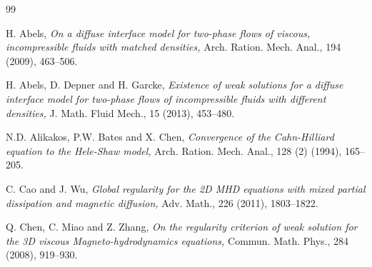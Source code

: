 \documentclass[11pt]{article}
\numberwithin{equation}{section}
\begin{document}
\begin{center}
\begin{thebibliography}{99}

H. Abels, {\it On a diffuse interface model for two-phase flows of viscous, incompressible fluids with matched densities,}  Arch. Ration. Mech. Anal., 194 (2009), 463--506.

H. Abels, D. Depner and  H. Garcke, {\it Existence of weak solutions for a diffuse interface model for two-phase flows of incompressible fluids with different densities,} J. Math. Fluid Mech., 15 (2013), 453--480.



 N.D. Alikakos, P.W. Bates and  X. Chen, {\it Convergence of the Cahn-Hilliard equation to the Hele-Shaw model,} Arch. Ration. Mech. Anal., 128 (2) (1994), 165--205.










 C. Cao and J. Wu, {\it  Global regularity for the 2D MHD equations with mixed partial dissipation and magnetic
diffusion,} Adv. Math., 226 (2011), 1803--1822.

 Q. Chen, C. Miao and Z. Zhang, {\it On the regularity criterion of weak solution for the 3D viscous Magneto-hydrodynamics equations,}
Commun. Math. Phys., 284 (2008), 919--930.


\end{thebibliography}
\end{center}
\end{document}
